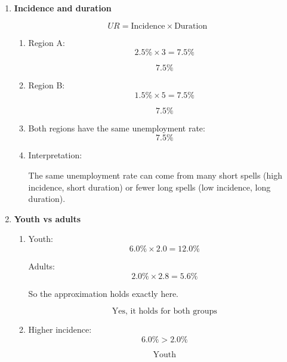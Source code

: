 \documentclass[12pt]{article}
\begin{document}
\begin{enumerate}[label=\textbf{Question \arabic*.}]
\begin{enumerate}[label=(\alph*)]
    \[
    \boxed{930{,}000}
    \]

    \item Unemployment rate:
    \[
    \frac{930{,}000}{16{,}000{,}000}\times 100 = 5.81\%
    \]

    \[
    \boxed{5.81\%}
    \]
\end{enumerate}


\item \textbf{Incidence and duration}

\[
UR = \text{Incidence} \times \text{Duration}
\]

\begin{enumerate}[label=(\alph*)]
    \item Region A:
    \[
    2.5\%\times 3 = 7.5\%
    \]

    \[
    \boxed{7.5\%}
    \]

    \item Region B:
    \[
    1.5\%\times 5 = 7.5\%
    \]

    \[
    \boxed{7.5\%}
    \]

    \item Both regions have the same unemployment rate:
    \[
    \boxed{7.5\%}
    \]

    \item Interpretation:

    The same unemployment rate can come from many short spells (high incidence, short duration) or fewer long spells (low incidence, long duration).
\end{enumerate}


\item \textbf{Youth vs adults}

\begin{enumerate}[label=(\alph*)]
    \item Youth:
    \[
    6.0\%\times 2.0 = 12.0\%
    \]

    Adults:
    \[
    2.0\%\times 2.8 = 5.6\%
    \]

    So the approximation holds exactly here.

    \[
    \boxed{\text{Yes, it holds for both groups}}
    \]

    \item Higher incidence:
    \[
    6.0\% > 2.0\%
    \]

    \[
    \boxed{\text{Youth}}
    \]


\end{enumerate}
\end{enumerate}
\end{document}
